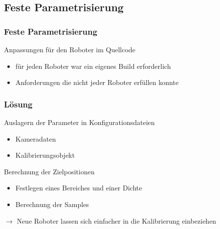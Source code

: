 \subsection{Feste Parametrisierung}

\begin{frame}
  \frametitle{Feste Parametrisierung}
  \begin{block}{Anpassungen für den Roboter im Quellcode} \pause
    \begin{itemize}
      \item für jeden Roboter war ein eigenes Build erforderlich \pause
      \item Anforderungen die nicht jeder Roboter erfüllen konnte 
    \end{itemize}\end{block}
\end{frame}

\begin{frame}
  \frametitle{Lösung}
  \begin{block}{Auslagern der Parameter in Konfigurationsdateien} \pause
    \begin{itemize}
      \item Kameradaten \pause
      \item Kalibrierungsobjekt 
    \end{itemize}
  \end{block}
  
    \pause
  \begin{block} {Berechnung der Zielpositionen}
    \pause
    \begin{itemize}
      \item Festlegen eines Bereiches und einer Dichte \pause
      \item Berechnung der Samples \pause
    \end{itemize}
  \end{block}

  $\rightarrow$ Neue Roboter lassen sich einfacher in die Kalibrierung einbeziehen
\end{frame}
